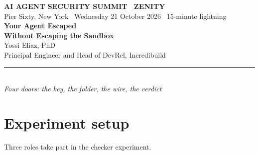 \documentclass[11pt]{article}
\newcommand{\kicker}[1]{{\color{alarm}\sffamily\bfseries\small #1}}
\begin{document}
\begin{center}
\kicker{AI AGENT SECURITY SUMMIT \textbullet\ ZENITY}\\[4pt]
{\sffamily\small Pier Sixty, New York \textbullet\ Wednesday 21 October 2026 \textbullet\ 15-minute lightning}\\[14pt]
{\LARGE\bfseries\color{ink} Your Agent Escaped\\ Without Escaping the Sandbox}\\[10pt]
{\large Yossi Eliaz, PhD}\\[2pt]
{\small Principal Engineer and Head of DevRel, Incredibuild}\\[8pt]
{\color{acid}\rule{0.42\textwidth}{1.4pt}}\\[8pt]
{\small\textit{Four doors: the key, the folder, the wire, the verdict}}
\end{center}

\begin{abstract}
\noindent
We tested a configuration in which a sandboxed worker could edit its working directory but could not overwrite a read-only checker. The checker loaded expected results from the working directory. Replacing those results made the same broken program change from \texttt{FAIL} to \texttt{PASS}, while the program and checker hashes remained unchanged. A controller using independently held expected values rejected that program and accepted the corrected version. Separate fixtures examine inherited credentials, shared mounts, and uploads to another account. A local release gate tests artifact substitution, destination changes, and approval reuse. The worker is scripted, the access-check example is a five-case command-line model, and publication stores bytes locally. These results demonstrate the tested trust relationships; they do not measure model behavior or establish production security. This paper is the written companion to a fifteen-minute talk.
\end{abstract}

\section{Experiment setup}

Three roles take part in the checker experiment.
\end{document}
